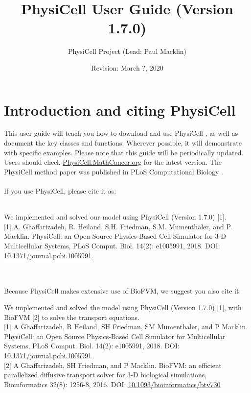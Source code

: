 \documentclass[12pt]{article}
\newcommand{\Version}{1.7.0}
\newcommand{\ReleaseDate}{March ?, 2020}
\newcommand{\blue}[1]{\textcolor{blue}{#1}}
\newcommand{\DONE}{}%
\begin{document}
\author{PhysiCell Project (Lead: Paul Macklin)}
\title{PhysiCell User Guide (Version \Version)}
\date{Revision: \ReleaseDate}%

\maketitle

\setlength{\parskip}{0in}
\hypertarget{TOC}{}
\tableofcontents
\setlength{\parskip}{8pt}

\section{Introduction and citing PhysiCell \DONE}
This user guide will teach you how to download and use PhysiCell \cite{ref:PhysiCell}, 
as well as document the key classes and functions. Wherever possible, it will demonstrate 
with specific examples. Please note that this guide will be periodically updated. Users 
should check \href{http://PhysiCell.MathCancer.org}{PhysiCell.MathCancer.org} for the latest version. 
The PhysiCell method paper was published in PLoS Computational Biology \cite{ref:PhysiCell}. \\
\\
If you use PhysiCell, please cite it as: \\
\\
\phantom{ }\hspace{.075\textwidth}\parbox[top]{0.85\textwidth}{%
We implemented and solved our model using PhysiCell (Version \Version) [1]. \\

[1] A. Ghaffarizadeh, R. Heiland, S.H. Friedman, S.M. Mumenthaler, and P. Macklin. PhysiCell: an Open Source Physics-Based Cell Simulator for 3-D Multicellular Systems, PLoS Comput. Biol. 14(2): e1005991, 2018. DOI: \href{https://dx.doi.org/10.1371/journal.pcbi.1005991}{10.1371/journal.pcbi.1005991}. } \\
\\
Because PhysiCell makes extensive use of BioFVM, we suggest you also cite it:  

\phantom{ }\hspace{.075\textwidth}\parbox[top]{0.85\textwidth}{%
We implemented and solved the model using PhysiCell (Version \Version) [1], with BioFVM [2] to solve the transport equations. \\

[1] A Ghaffarizadeh, R Heiland, SH Friedman, SM Mumenthaler, and P Macklin. PhysiCell: an Open Source Physics-Based Cell Simulator for Multicellular Systems, PLoS Comput. Biol. 14(2): e1005991, 2018. DOI: \href{https://dx.doi.org/10.1371/journal.pcbi.1005991}{10.1371/journal.pcbi.1005991} \\

[2] A Ghaffarizadeh, SH Friedman, and P Macklin. BioFVM: an efficient parallelized diffusive transport solver for 3-D biological simulations, Bioinformatics 32(8): 1256-8, 2016. DOI: \href{https://dx.doi.org/10.1093/bioinformatics/btv730}{10.1093/bioinformatics/btv730}  
}
\end{document}
